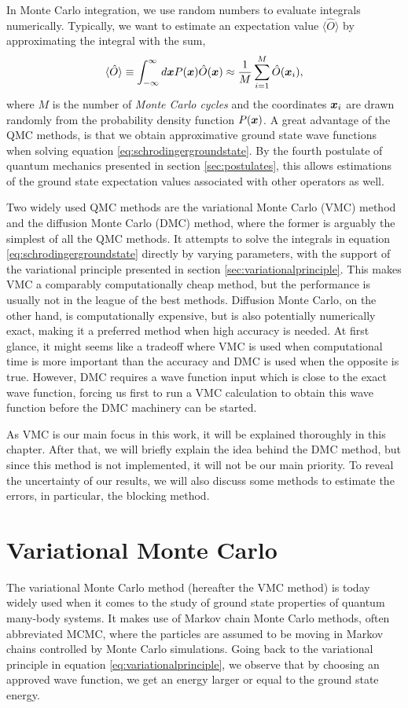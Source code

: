 In Monte Carlo integration, we use random numbers to evaluate integrals numerically. Typically, we want to estimate an expectation value $\langle\hat{O}\rangle$ by approximating the integral with the sum,
\begin{equation}
\langle \hat{O}\rangle\equiv\int_{-\infty}^{\infty}d\boldsymbol{{x}}P(\boldsymbol{{x}})\hat{O}(\boldsymbol{{x}})\approx\frac{1}{M}\sum_{i=1}^M\hat{O}(\boldsymbol{{x}}_i),
\label{eq:montecarlointegration}
\end{equation}
where $M$ is the number of \textit{Monte Carlo cycles} and the coordinates $\boldsymbol{{x}}_i$ are drawn randomly from the probability density function $P(\boldsymbol{{x}})$. A great advantage of the QMC methods, is that we obtain approximative ground state wave functions when solving equation \eqref{eq:schrodingergroundstate}. By the fourth postulate of quantum mechanics presented in section \ref{sec:postulates}, this allows estimations of the ground state expectation values associated with other operators as well. 

Two widely used QMC methods are the variational Monte Carlo (VMC) method and the diffusion Monte Carlo (DMC) method, where the former is arguably the simplest of all the QMC methods. It attempts to solve the integrals in equation \eqref{eq:schrodingergroundstate} directly by varying parameters, with the support of the variational principle presented in section \ref{sec:variationalprinciple}. This makes VMC a comparably computationally cheap method, but the performance is usually not in the league of the best methods. Diffusion Monte Carlo, on the other hand, is computationally expensive, but is also potentially numerically exact, making it a preferred method when high accuracy is needed. At first glance, it might seems like a tradeoff where VMC is used when computational time is more important than the accuracy and DMC is used when the opposite is true. However, DMC requires a wave function input which is close to the exact wave function, forcing us first to run a VMC calculation to obtain this wave function before the DMC machinery can be started.

As VMC is our main focus in this work, it will be explained thoroughly in this chapter. After that, we will briefly explain the idea behind the DMC method, but since this method is not implemented, it will not be our main priority. To reveal the uncertainty of our results, we will also discuss some methods to estimate the errors, in particular, the blocking method.

\section{Variational Monte Carlo} \label{sec:vmc}
The variational Monte Carlo method (hereafter the VMC method) is today widely used when it comes to the study of ground state properties of quantum many-body systems. It makes use of Markov chain Monte Carlo methods, often abbreviated MCMC, where the particles are assumed to be moving in Markov chains controlled by Monte Carlo simulations. Going back to the variational principle in equation \eqref{eq:variationalprinciple}, we observe that by choosing an approved wave function, we get an energy larger or equal to the ground state energy.


